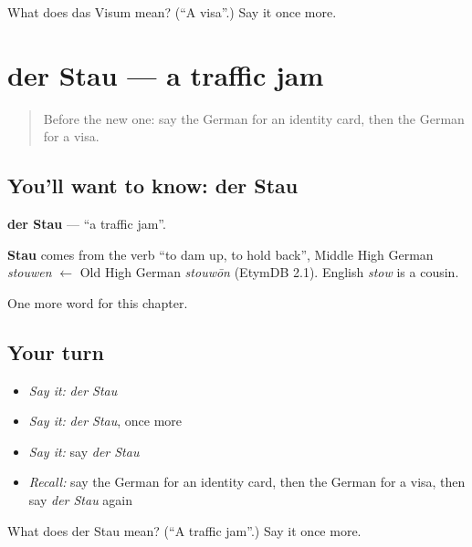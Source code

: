 \begin{tcolorbox}[breakable,colback=teal!4,colframe=teal!35!black,title={Before you move on}]
What does das Visum mean? (\textquotedblleft{}A visa\textquotedblright{}.) Say it once more.
\end{tcolorbox}
\section[der Stau]{der Stau — a traffic jam}

\label{lesson:GE-C155-stau}



\begin{quote}
Before the new one: say the German for an identity card, then the German for a visa.
\end{quote}

\subsection*{You'll want to know: der Stau}
\textbf{der Stau} — \textquotedblleft{}a traffic jam\textquotedblright{}.

\begin{cousinweb}
\textbf{Stau} comes from the verb \textquotedblleft{}to dam up, to hold back\textquotedblright{}, Middle High German \emph{stouwen} $\leftarrow$ Old High German \emph{stouwōn} (EtymDB 2.1). English \emph{stow} is a cousin.
\end{cousinweb}

\begin{grammarlens}[title={What you've built}]
One more word for this chapter.
\end{grammarlens}

\subsection*{Your turn}
\begin{itemize}
\raggedright
  \item \emph{Say it:} \emph{der Stau}
  \item \emph{Say it:} \emph{der Stau}, once more
  \item \emph{Say it:} say \emph{der Stau}
  \item \emph{Recall:} say the German for an identity card, then the German for a visa, then say \emph{der Stau} again
\end{itemize}

\begin{tcolorbox}[breakable,colback=teal!4,colframe=teal!35!black,title={Before you move on}]
What does der Stau mean? (\textquotedblleft{}A traffic jam\textquotedblright{}.) Say it once more.
\end{tcolorbox}
